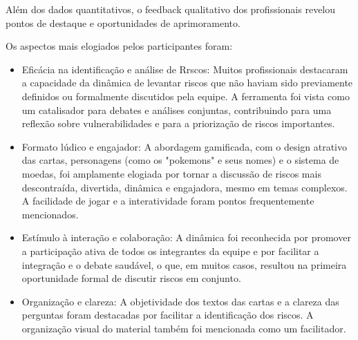 \documentclass[
	12pt,
	openright,
	twoside,
	a4paper,
	english,
	brazil
	]{abntex2}
\begin{document}
Além dos dados quantitativos, o feedback qualitativo dos profissionais revelou pontos de destaque e oportunidades de aprimoramento.

Os aspectos mais elogiados pelos participantes foram:
\begin{itemize}
  \item Eficácia na identificação e análise de Rrscos: Muitos profissionais destacaram a capacidade da dinâmica de levantar riscos que não haviam sido previamente definidos ou formalmente discutidos pela equipe. A ferramenta foi vista como um catalisador para debates e análises conjuntas, contribuindo para uma reflexão sobre vulnerabilidades e para a priorização de riscos importantes.
  \item Formato lúdico e engajador: A abordagem gamificada, com o design atrativo das cartas, personagens (como os "pokemons" e seus nomes) e o sistema de moedas, foi amplamente elogiada por tornar a discussão de riscos mais descontraída, divertida, dinâmica e engajadora, mesmo em temas complexos. A facilidade de jogar e a interatividade foram pontos frequentemente mencionados.
  \item Estímulo à interação e colaboração: A dinâmica foi reconhecida por promover a participação ativa de todos os integrantes da equipe e por facilitar a integração e o debate saudável, o que, em muitos casos, resultou na primeira oportunidade formal de discutir riscos em conjunto.
  \item Organização e clareza: A objetividade dos textos das cartas e a clareza das perguntas foram destacadas por facilitar a identificação dos riscos. A organização visual do material também foi mencionada como um facilitador.
\end{itemize}
\end{document}
